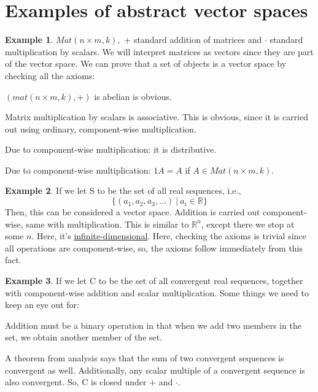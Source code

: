 \documentclass[a4paper, 12pt]{article}
\theoremstyle{definition}
\newtheorem{exmp}{Example}[section]
\theoremstyle{definition}
\theoremstyle{definition}
\theoremstyle{definition}
\newenvironment{enumerate_tight}{
	\begin{enumerate}
		\setlength{\itemsep}{0pt}
		\setlength{\parskip}{0pt}
	}{\end{enumerate}}
\newenvironment{itemize_tight}{
	\begin{itemize}
		\setlength{\itemsep}{0pt}
		\setlength{\parskip}{0pt}
	}{\end{itemize}}
\begin{document}
{\section{Examples of abstract vector spaces}
\begin{exmp}
	$Mat(n \times m, k),$ $+$ standard addition of matrices and $\cdot$ standard multiplication by scalars. 
	\newline
	\newline
	We will interpret matrices as vectors since they are part of the vector space. We can prove that a set of objects is a vector space by checking all the axioms: 
	\begin{enumerate_tight}
		\item $(mat(n \times m, k), +)$ is abelian is obvious. 
		\item Matrix multiplication by scalars is associative. This is obvious, since it is carried out using ordinary, component-wise multiplication. 
		\item Due to component-wise multiplication: it is distributive. 
		\item Due to component-wise multiplication: $1A = A$ if $A \in Mat(n \times m, k)$. 
	\end{enumerate_tight}
\end{exmp}

\begin{exmp}
	If we let S to be the set of all real sequences, i.e., 
	$$ \{ (a_1, a_2, a_3,...)\ |\ a_i \in \mathbb{R} \}$$
	Then, this can be considered a vector space. Addition is carried out component-wise, same with multiplication. This is similar to $\mathbb{R}^n$, except there we stop at some $n$. Here, it's \underline{infinite-dimensional}. Here, checking the axioms is trivial since all operations are component-wise, so, the axioms follow immediately from this fact. 
\end{exmp}

\begin{exmp}
	If we let C to be the set of all convergent real sequences, together with component-wise addition and scalar multiplication. Some things we need to keep an eye out for:
	\begin{itemize_tight}
		\item Addition must be a binary operation in that when we add two members in the set, we obtain another member of the set. 
		\item A theorem from analysis says that the sum of two convergent sequences is convergent as well. Additionally, any scalar multiple of a convergent sequence is also convergent. So, C is closed under $+$ and $\cdot$. 
	\end{itemize_tight}
\end{exmp}

}
\end{document}
